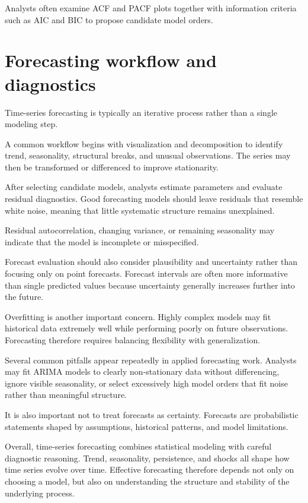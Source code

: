 \documentclass[
  11pt,
  oneside]{book}
\begin{document}
Analysts often examine ACF and PACF plots together with information criteria such as AIC and BIC to propose candidate model orders.

\section{Forecasting workflow and diagnostics}\label{forecasting-workflow-and-diagnostics}

Time-series forecasting is typically an iterative process rather than a single modeling step.

A common workflow begins with visualization and decomposition to identify trend, seasonality, structural breaks, and unusual observations. The series may then be transformed or differenced to improve stationarity.

After selecting candidate models, analysts estimate parameters and evaluate residual diagnostics. Good forecasting models should leave residuals that resemble white noise, meaning that little systematic structure remains unexplained.

Residual autocorrelation, changing variance, or remaining seasonality may indicate that the model is incomplete or misspecified.

Forecast evaluation should also consider plausibility and uncertainty rather than focusing only on point forecasts. Forecast intervals are often more informative than single predicted values because uncertainty generally increases further into the future.

Overfitting is another important concern. Highly complex models may fit historical data extremely well while performing poorly on future observations. Forecasting therefore requires balancing flexibility with generalization.

Several common pitfalls appear repeatedly in applied forecasting work. Analysts may fit ARIMA models to clearly non-stationary data without differencing, ignore visible seasonality, or select excessively high model orders that fit noise rather than meaningful structure.

It is also important not to treat forecasts as certainty. Forecasts are probabilistic statements shaped by assumptions, historical patterns, and model limitations.

Overall, time-series forecasting combines statistical modeling with careful diagnostic reasoning. Trend, seasonality, persistence, and shocks all shape how time series evolve over time. Effective forecasting therefore depends not only on choosing a model, but also on understanding the structure and stability of the underlying process.
\end{document}
